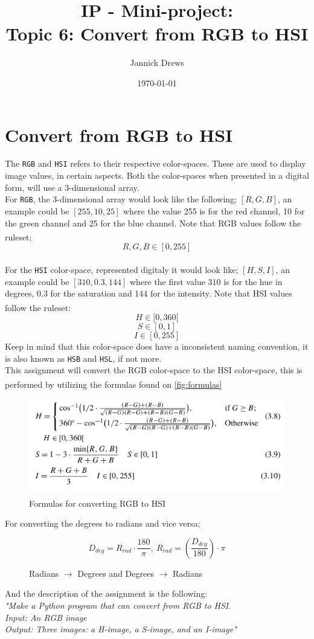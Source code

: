 \documentclass{article}
\title{IP - Mini-project:\\Topic 6: Convert from RGB to HSI}
\author{Jannick Drews}
\date{\today}
\newcommand{\goodcite}[1]{\textsuperscript{\cite{#1}}}
\begin{document}
\maketitle
\newpage
{}

\section{Convert from RGB to HSI}
The \texttt{RGB} and \texttt{HSI} refers to their respective color-spaces. These are used to display image values, in certain aspects. Both the color-spaces when presented in a digital form, will use a 3-dimensional array.\\
For \texttt{RGB}, the 3-dimensional array would look like the following; $[R, G, B]$, an example could be $[255, 10, 25]$ where the value 255 is for the red channel, 10 for the green channel and 25 for the blue channel. Note that RGB values follow the ruleset\goodcite{IP}; $$ R,G,B \in [0, 255] $$\\
For the \texttt{HSI} color-space, represented digitaly it would look like; $[H, S, I]$, an example could be $[310, 0.3, 144]$ where the first value 310 is for the hue in degrees, 0.3 for the saturation and 144 for the intensity. Note that HSI values follow the ruleset\goodcite{IP}: $$ H \in [0, 360[ $$ $$ S \in [0, 1]$$ $$ I \in [0, 255]$$ Keep in mind that this color-space does have a inconsistent naming convention, it is also known as \texttt{HSB} and \texttt{HSL}, if not more.\medskip \\
This assignment will convert the RGB color-space to the HSI color-space, this is performed by utilizing the formulas found on \autoref{fig:formulas} \goodcite{IP}
\begin{figure}[H]
    \centering
    \includegraphics[width=\textwidth]{img/formula.png}
    \caption{Formulas for converting RGB to HSI\goodcite{IP}}
    \label{fig:formulas}
\end{figure}
For converting the degrees to radians and vice versa;
\begin{figure}[H]
    \centering
    $$ D_{deg} = R_{rad} \cdot \frac{180}{\pi},\ R_{rad} = (\frac{D_{deg}}{180}) \cdot \pi $$
    \caption{Radians $\rightarrow$ Degrees and Degrees $\rightarrow$ Radians}
    \label{fig:convert}
\end{figure}
And the description of the assignment is the following:\\
\textit{"Make a Python program that can convert from RGB to HSI.\\Input: An RGB image\\Output: Three images: a H-image, a S-image, and an I-image"}
\end{document}
